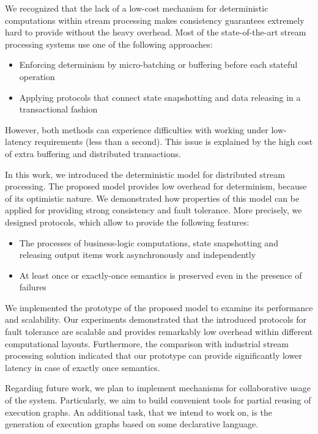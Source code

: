 
\label {fs-conclusion-seciton}

We recognized that the lack of a low-cost mechanism for deterministic computations within stream processing makes consistency guarantees extremely hard to provide without the heavy overhead. Most of the state-of-the-art stream processing systems use one of the following approaches: 
\begin{itemize}
    \item Enforcing determinism by micro-batching or buffering before each stateful operation
    \item Applying protocols that connect state snapshotting and data releasing in a transactional fashion
\end{itemize}

However, both methods can experience difficulties with working under low-latency requirements (less than a second). This issue is explained by the high cost of extra buffering and distributed transactions.

In this work, we introduced the deterministic model for distributed stream processing. The proposed model provides low overhead for determinism, because of its optimistic nature. We demonstrated how properties of this model can be applied for providing strong consistency and fault tolerance. More precisely, we designed protocols, which allow to provide the following features:

\begin{itemize}
    \item The processes of business-logic computations, state snapshotting and releasing output items work asynchronously and independently
    \item At least once or exactly-once semantics is preserved even in the presence of failures
\end{itemize}

We implemented the prototype of the proposed model to examine its performance and scalability. Our experiments demonstrated that the introduced protocols for fault tolerance are scalable and provides remarkably low overhead within different computational layouts. Furthermore, the comparison with industrial stream processing solution indicated that our prototype can provide significantly lower latency in case of exactly once semantics.

Regarding future work, we plan to implement mechanisms for collaborative usage of the system. Particularly, we aim to build convenient tools for partial reusing of execution graphs. An additional task, that we intend to work on, is the generation of execution graphs based on some declarative language.